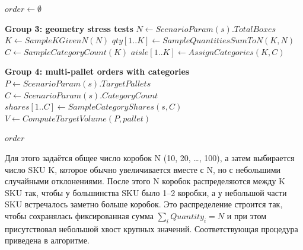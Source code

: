 \begin{algorithm}[htbp]
\caption{Generate a single order (groups 3--4)}
\label{alg:gen-order-34}

$order \leftarrow \emptyset$\;

\BlankLine
\textbf{Group 3: geometry stress tests}\;
$N \leftarrow ScenarioParam(s).TotalBoxes$\;
$K \leftarrow SampleKGivenN(N)$\;
$qty[1..K] \leftarrow SampleQuantitiesSumToN(K, N)$\;
$C \leftarrow SampleCategoryCount(K)$\;
$aisle[1..K] \leftarrow AssignCategories(K, C)$\;


\BlankLine
\textbf{Group 4: multi-pallet orders with categories}\;
$P \leftarrow ScenarioParam(s).TargetPallets$\;
$C \leftarrow ScenarioParam(s).CategoryCount$\;
$shares[1..C] \leftarrow SampleCategoryShares(s, C)$\;
$V \leftarrow ComputeTargetVolume(P, pallet)$\;


\Return $order$\;
\end{algorithm}

Для этого задаётся общее число коробок N (10, 20, …, 100), а затем выбирается число SKU K, которое обычно увеличивается вместе с N, но с небольшими случайными отклонениями. После этого N коробок распределяются между K SKU так, чтобы у большинства SKU было 1–2 коробки, а у небольшой части SKU встречалось заметно больше коробок. Это распределение строится так, чтобы сохранялась фиксированная сумма $\sum_i Quantity_i = N$ и при этом присутствовал небольшой хвост крупных значений. Соответствующая процедура приведена в алгоритме.

